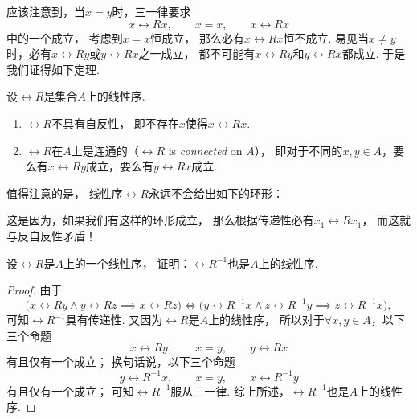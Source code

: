 应该注意到，当\(x = y\)时，三一律要求\[
	x \rel{R} x, \qquad
	x = x, \qquad
	x \rel{R} x
\]中的一个成立，
考虑到\(x = x\)恒成立，
那么必有\(x \rel{R} x\)恒不成立.
易见当\(x \neq y\)时，必有\(x \rel{R} y\)或\(y \rel{R} x\)之一成立，
都不可能有\(x \rel{R} y\)和\(y \rel{R} x\)都成立.
于是我们证得如下定理.

\begin{theorem}
设\(\rel{R}\)是集合\(A\)上的线性序.
\begin{enumerate}
	\item \(\rel{R}\)不具有自反性，
	即不存在\(x\)使得\(x \rel{R} x\).

	\item \(\rel{R}\)在\(A\)上是连通的（\(\rel{R}\) is \emph{connected} on \(A\)），
	即对于不同的\(x,y \in A\)，要么有\(x \rel{R} y\)成立，要么有\(y \rel{R} x\)成立.
\end{enumerate}
\end{theorem}

值得注意的是，
线性序\(\rel{R}\)永远不会给出如下的环形：
\begin{center}
\end{center}
这是因为，如果我们有这样的环形成立，
那么根据传递性必有\(x_1 \rel{R} x_1\)，
而这就与反自反性矛盾！

\begin{example}
设\(\rel{R}\)是\(A\)上的一个线性序，
证明：\(\rel{R}^{-1}\)也是\(A\)上的线性序.
\begin{proof}
由于\[
	\bigl( x \rel{R} y \land y \rel{R} z \implies x \rel{R} z \bigr)
	\iff
	\bigl( y \rel{R}^{-1} x \land z \rel{R}^{-1} y \implies z \rel{R}^{-1} x \bigr),
\]
可知\(\rel{R}^{-1}\)具有传递性.
又因为\(\rel{R}\)是\(A\)上的线性序，
所以对于\(\forall x,y \in A\)，以下三个命题\[
	x \rel{R} y, \qquad
	x = y, \qquad
	y \rel{R} x
\]有且仅有一个成立；
换句话说，以下三个命题\[
	y \rel{R}^{-1} x, \qquad
	x = y, \qquad
	x \rel{R}^{-1} y
\]有且仅有一个成立；
可知\(\rel{R}^{-1}\)服从三一律.
综上所述，\(\rel{R}^{-1}\)也是\(A\)上的线性序.
\end{proof}
\end{example}
